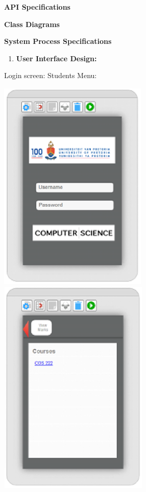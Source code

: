 \documentclass{article}
\begin{document}
\noindent \textbf{API Specifications}
	

\noindent \textbf{Class Diagrams}

\noindent \textbf{System Process Specifications}

\noindent \textbf{}

\noindent \textbf{}

\noindent \textbf{}

\noindent \textbf{}

\noindent \textbf{}

\noindent \textbf{}

\noindent \textbf{}

\noindent \textbf{}

\noindent \textbf{}

\noindent \textbf{}

\begin{enumerate}
\item \textbf{ User Interface Design:}
\end{enumerate}

\noindent \textbf{}

          Login screen:                        Students Menu:

\includegraphics*[width=2.79in, height=4.01in, keepaspectratio=false]{image13}  \includegraphics*[width=2.82in, height=4.11in, keepaspectratio=false]{image14}  
\end{document}
